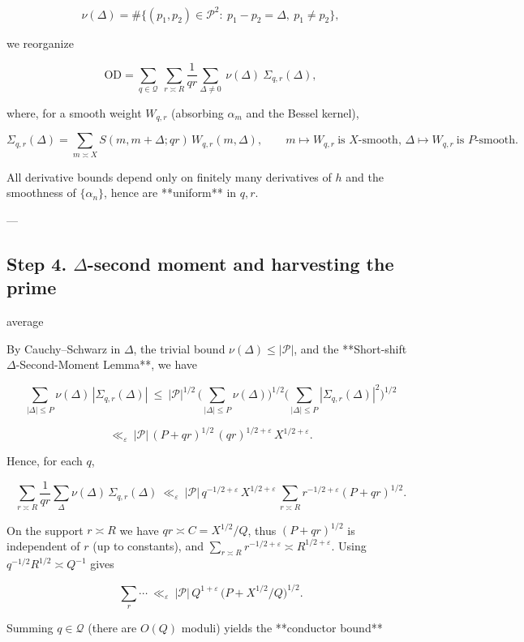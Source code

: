 \documentclass[11pt]{article}
\theoremstyle{definition}
\theoremstyle{remark}
\begin{document}
$$
\nu(\Delta)=\#\{(p_1,p_2)\in\mathcal P^2:\ p_1-p_2=\Delta,\ p_1\ne p_2\},
$$

we reorganize

$$
\mathrm{OD}
=\sum_{q\in\mathcal Q}\ \sum_{r\asymp R} \frac{1}{qr}
\sum_{\Delta\ne 0}\ \nu(\Delta)\ \Sigma_{q,r}(\Delta),
$$

where, for a smooth weight $W_{q,r}$ (absorbing $\alpha_m$ and the Bessel kernel),

$$
\Sigma_{q,r}(\Delta)=\sum_{m\asymp X} S(m,m+\Delta;qr)\,W_{q,r}(m,\Delta),
\qquad m\mapsto W_{q,r}\ \text{is }X\text{-smooth,\ } \Delta\mapsto W_{q,r}\ \text{is }P\text{-smooth}.
$$

All derivative bounds depend only on finitely many derivatives of $h$ and the smoothness of $\{\alpha_n\}$, hence are **uniform** in $q,r$.

---

\subsection*{Step 4. $\Delta$-second moment and harvesting the prime}average

By Cauchy–Schwarz in $\Delta$, the trivial bound $\nu(\Delta)\le |\mathcal P|$, and the **Short-shift $\Delta$-Second-Moment Lemma**, we have

$$
\sum_{|\Delta|\le P}\nu(\Delta)\,|\Sigma_{q,r}(\Delta)|
\ \le\ |\mathcal P|^{1/2}\,\Big(\sum_{|\Delta|\le P}\nu(\Delta)\Big)^{1/2}
\Big(\sum_{|\Delta|\le P}|\Sigma_{q,r}(\Delta)|^2\Big)^{1/2}
$$

$$
\ll_\varepsilon\ |\mathcal P|\,(P+qr)^{1/2}\,(qr)^{1/2+\varepsilon}\,X^{1/2+\varepsilon}.
$$

Hence, for each $q$,

$$
\sum_{r\asymp R}\frac{1}{qr}\sum_{\Delta}\nu(\Delta)\,\Sigma_{q,r}(\Delta)
\ \ll_\varepsilon\ |\mathcal P|\,q^{-1/2+\varepsilon}\,X^{1/2+\varepsilon}\,
\sum_{r\asymp R} r^{-1/2+\varepsilon}(P+qr)^{1/2}.
$$

On the support $r\asymp R$ we have $qr\asymp C=X^{1/2}/Q$, thus $(P+qr)^{1/2}$ is independent of $r$ (up to constants), and $\sum_{r\asymp R} r^{-1/2+\varepsilon}\asymp R^{1/2+\varepsilon}$. Using $q^{-1/2}R^{1/2}\asymp Q^{-1}$ gives

$$
\sum_{r}\cdots\ \ll_\varepsilon\ |\mathcal P|\,Q^{1+\varepsilon}\,\big(P+X^{1/2}/Q\big)^{1/2}.
$$

Summing $q\in\mathcal Q$ (there are $O(Q)$ moduli) yields the **conductor bound**
\end{document}
